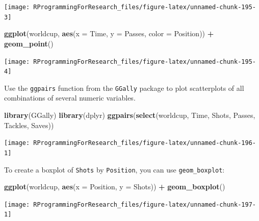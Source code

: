 \documentclass[]{book}
\makeatletter
\newenvironment{Shaded}{\begin{snugshade}}{\end{snugshade}}
\newcommand{\KeywordTok}[1]{\textcolor[rgb]{0.13,0.29,0.53}{\textbf{#1}}}
\newcommand{\DataTypeTok}[1]{\textcolor[rgb]{0.13,0.29,0.53}{#1}}
\newcommand{\StringTok}[1]{\textcolor[rgb]{0.31,0.60,0.02}{#1}}
\newcommand{\OperatorTok}[1]{\textcolor[rgb]{0.81,0.36,0.00}{\textbf{#1}}}
\newcommand{\NormalTok}[1]{#1}
\newenvironment{kframe}{%
\medskip{}
\setlength{\fboxsep}{.8em}
 \def\at@end@of@kframe{}%
 \ifinner\ifhmode%
  \def\at@end@of@kframe{\end{minipage}}%
  \begin{minipage}{\columnwidth}%
 \fi\fi%
 \def\FrameCommand##1{\hskip\@totalleftmargin \hskip-\fboxsep
 \colorbox{shadecolor}{##1}\hskip-\fboxsep
     \hskip-\linewidth \hskip-\@totalleftmargin \hskip\columnwidth}%
 \MakeFramed {\advance\hsize-\width
   \@totalleftmargin\z@ \linewidth\hsize
   \@setminipage}}%
 {\par\unskip\endMakeFramed%
 \at@end@of@kframe}
\renewenvironment{Shaded}{\begin{kframe}}{\end{kframe}}
\theoremstyle{definition}
\theoremstyle{definition}
\theoremstyle{definition}
\theoremstyle{remark}
\makeatother
\begin{document}
\begin{center}\texttt{[image: RProgrammingForResearch\_files/figure-latex/unnamed-chunk-195-3]} \end{center}

\begin{Shaded}
\begin{Highlighting}[]
\KeywordTok{ggplot}\NormalTok{(worldcup, }\KeywordTok{aes}\NormalTok{(}\DataTypeTok{x =}\NormalTok{ Time, }\DataTypeTok{y =}\NormalTok{ Passes, }\DataTypeTok{color =}\NormalTok{ Position)) }\OperatorTok{+}\StringTok{ }
\StringTok{  }\KeywordTok{geom_point}\NormalTok{()}
\end{Highlighting}
\end{Shaded}

\begin{center}\texttt{[image: RProgrammingForResearch\_files/figure-latex/unnamed-chunk-195-4]} \end{center}

Use the \texttt{ggpairs} function from the \texttt{GGally} package to
plot scatterplots of all combinations of several numeric variables.

\begin{Shaded}
\begin{Highlighting}[]
\KeywordTok{library}\NormalTok{(GGally)}
\KeywordTok{library}\NormalTok{(dplyr)}
\KeywordTok{ggpairs}\NormalTok{(}\KeywordTok{select}\NormalTok{(worldcup, Time, Shots, Passes, Tackles, Saves))}
\end{Highlighting}
\end{Shaded}

\begin{center}\texttt{[image: RProgrammingForResearch\_files/figure-latex/unnamed-chunk-196-1]} \end{center}

To create a boxplot of \texttt{Shots} by \texttt{Position}, you can use
\texttt{geom\_boxplot}:

\begin{Shaded}
\begin{Highlighting}[]
\KeywordTok{ggplot}\NormalTok{(worldcup, }\KeywordTok{aes}\NormalTok{(}\DataTypeTok{x =}\NormalTok{ Position, }\DataTypeTok{y =}\NormalTok{ Shots)) }\OperatorTok{+}\StringTok{ }
\StringTok{  }\KeywordTok{geom_boxplot}\NormalTok{()}
\end{Highlighting}
\end{Shaded}

\begin{center}\texttt{[image: RProgrammingForResearch\_files/figure-latex/unnamed-chunk-197-1]} \end{center}
\end{document}
